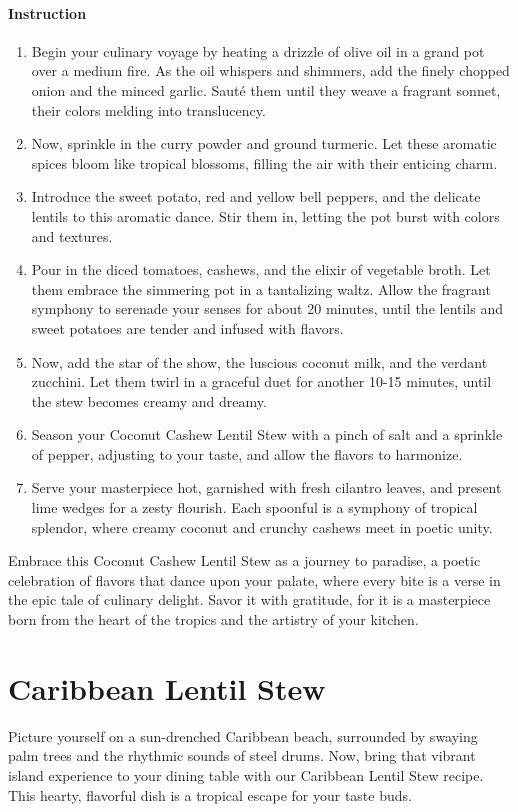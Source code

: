 \paragraph{Instruction}
\begin{enumerate}[noitemsep]
	\item Begin your culinary voyage by heating a drizzle of olive oil in a grand pot over a medium fire. As the oil whispers and shimmers, add the finely chopped onion and the minced garlic. Sauté them until they weave a fragrant sonnet, their colors melding into translucency.
	\item Now, sprinkle in the curry powder and ground turmeric. Let these aromatic spices bloom like tropical blossoms, filling the air with their enticing charm.
	\item Introduce the sweet potato, red and yellow bell peppers, and the delicate lentils to this aromatic dance. Stir them in, letting the pot burst with colors and textures.
	\item Pour in the diced tomatoes, cashews, and the elixir of vegetable broth. Let them embrace the simmering pot in a tantalizing waltz. Allow the fragrant symphony to serenade your senses for about 20 minutes, until the lentils and sweet potatoes are tender and infused with flavors.
	\item Now, add the star of the show, the luscious coconut milk, and the verdant zucchini. Let them twirl in a graceful duet for another 10-15 minutes, until the stew becomes creamy and dreamy.
	\item Season your Coconut Cashew Lentil Stew with a pinch of salt and a sprinkle of pepper, adjusting to your taste, and allow the flavors to harmonize.
	\item Serve your masterpiece hot, garnished with fresh cilantro leaves, and present lime wedges for a zesty flourish. Each spoonful is a symphony of tropical splendor, where creamy coconut and crunchy cashews meet in poetic unity.
\end{enumerate}

Embrace this Coconut Cashew Lentil Stew as a journey to paradise, a poetic celebration of flavors that dance upon your palate, where every bite is a verse in the epic tale of culinary delight. Savor it with gratitude, for it is a masterpiece born from the heart of the tropics and the artistry of your kitchen.
\clearpage

\section{Caribbean Lentil Stew}
\label{caribbeanlentilstew}
Picture yourself on a sun-drenched Caribbean beach, surrounded by swaying palm trees and the rhythmic sounds of steel drums. Now, bring that vibrant island experience to your dining table with our Caribbean Lentil Stew recipe. This hearty, flavorful dish is a tropical escape for your taste buds.

